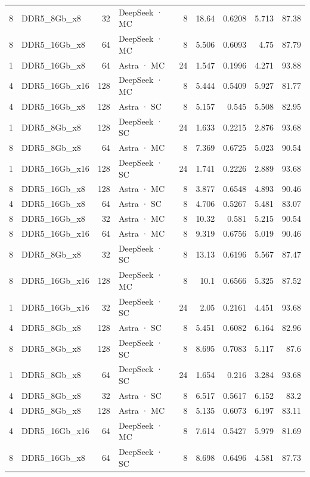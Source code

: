 \begin{tabular}{rlrlrrrrr}
8 & DDR5\_8Gb\_x8 & 32 & DeepSeek · MC & 8 & 18.64 & 0.6208 & 5.713 & 87.38 \\
8 & DDR5\_16Gb\_x8 & 64 & DeepSeek · MC & 8 & 5.506 & 0.6093 & 4.75 & 87.79 \\
1 & DDR5\_16Gb\_x8 & 64 & Astra · MC & 24 & 1.547 & 0.1996 & 4.271 & 93.88 \\
4 & DDR5\_16Gb\_x16 & 128 & DeepSeek · MC & 8 & 5.444 & 0.5409 & 5.927 & 81.77 \\
4 & DDR5\_16Gb\_x8 & 128 & Astra · SC & 8 & 5.157 & 0.545 & 5.508 & 82.95 \\
1 & DDR5\_8Gb\_x8 & 128 & DeepSeek · SC & 24 & 1.633 & 0.2215 & 2.876 & 93.68 \\
8 & DDR5\_8Gb\_x8 & 64 & Astra · MC & 8 & 7.369 & 0.6725 & 5.023 & 90.54 \\
1 & DDR5\_16Gb\_x16 & 128 & DeepSeek · SC & 24 & 1.741 & 0.2226 & 2.889 & 93.68 \\
8 & DDR5\_16Gb\_x8 & 128 & Astra · MC & 8 & 3.877 & 0.6548 & 4.893 & 90.46 \\
4 & DDR5\_16Gb\_x8 & 64 & Astra · SC & 8 & 4.706 & 0.5267 & 5.481 & 83.07 \\
8 & DDR5\_16Gb\_x8 & 32 & Astra · MC & 8 & 10.32 & 0.581 & 5.215 & 90.54 \\
8 & DDR5\_16Gb\_x16 & 64 & Astra · MC & 8 & 9.319 & 0.6756 & 5.019 & 90.46 \\
8 & DDR5\_8Gb\_x8 & 32 & DeepSeek · SC & 8 & 13.13 & 0.6196 & 5.567 & 87.47 \\
8 & DDR5\_16Gb\_x16 & 128 & DeepSeek · MC & 8 & 10.1 & 0.6566 & 5.325 & 87.52 \\
1 & DDR5\_16Gb\_x16 & 32 & DeepSeek · SC & 24 & 2.05 & 0.2161 & 4.451 & 93.68 \\
4 & DDR5\_8Gb\_x8 & 128 & Astra · SC & 8 & 5.451 & 0.6082 & 6.164 & 82.96 \\
8 & DDR5\_8Gb\_x8 & 128 & DeepSeek · SC & 8 & 8.695 & 0.7083 & 5.117 & 87.6 \\
1 & DDR5\_8Gb\_x8 & 64 & DeepSeek · SC & 24 & 1.654 & 0.216 & 3.284 & 93.68 \\
4 & DDR5\_8Gb\_x8 & 32 & Astra · SC & 8 & 6.517 & 0.5617 & 6.152 & 83.2 \\
4 & DDR5\_8Gb\_x8 & 128 & Astra · MC & 8 & 5.135 & 0.6073 & 6.197 & 83.11 \\
4 & DDR5\_16Gb\_x16 & 64 & DeepSeek · MC & 8 & 7.614 & 0.5427 & 5.979 & 81.69 \\
8 & DDR5\_16Gb\_x8 & 64 & DeepSeek · SC & 8 & 8.698 & 0.6496 & 4.581 & 87.73 \\

\end{tabular}
